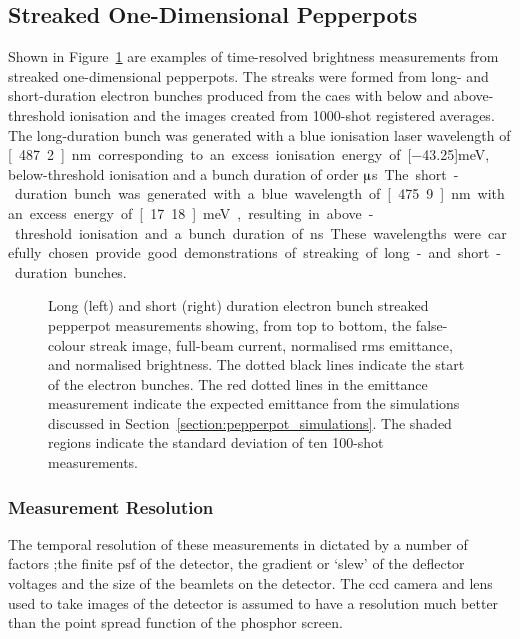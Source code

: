 \subsection{Streaked One-Dimensional Pepperpots}\label{section:streaked_pepperpot_results}
Shown in Figure~\ref{figure:streaks} are examples of time-resolved brightness measurements from streaked one-dimensional pepperpots.
The streaks were formed from long- and short-duration electron bunches produced from the \gls{caes} with below and above-threshold ionisation and the images created from 1000-shot registered averages.
The long-duration bunch was generated with a blue ionisation laser wavelength of \unit[487.2]{nm} corresponding to an excess ionisation energy of \unit[$-$43.25]{meV}, below-threshold ionisation and a bunch duration of order \unit[10]{$\muup$s}.
The short-duration bunch was generated with a blue wavelength of \unit[475.9]{nm} with an excess energy of \unit[17.18]{meV}, resulting in above-threshold ionisation and a bunch duration of \unit[5]{ns}.
These wavelengths were carefully chosen provide good demonstrations of streaking of long- and short-duration bunches.

\begin{figure}
    \center
    
    \caption[Streaked brightness measurements for $\muup$ and ns timescales.]{Long (left) and short (right) duration electron bunch streaked pepperpot measurements showing, from top to bottom, the false-colour streak image, full-beam current, normalised \gls{rms} emittance, and normalised brightness. The dotted black lines indicate the start of the electron bunches. The red dotted lines in the emittance measurement indicate the expected emittance from the simulations discussed in Section~\ref{section:pepperpot_simulations}. The shaded regions indicate the standard deviation of ten 100-shot measurements.}
    \label{figure:streaks}
\end{figure}

\subsubsection{Measurement Resolution}
The temporal resolution of these measurements in dictated by a number of factors ;the finite \gls{psf} of the detector, the gradient or `slew' of the deflector voltages and the size of the beamlets on the detector.
The \gls{ccd} camera and lens used to take images of the detector is assumed to have a resolution much better than the point spread function of the phosphor screen.

